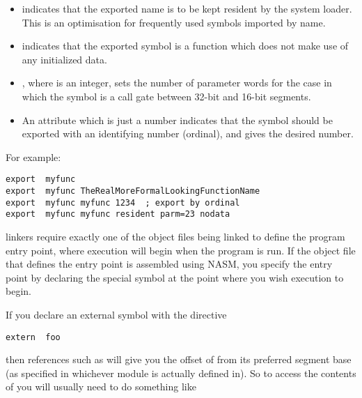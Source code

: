 \begin{itemize}
    \item{ indicates that the exported name is
        to be kept resident by the system loader. This is
        an optimisation for frequently used symbols imported
        by name.}

    \item{ indicates that the exported symbol
        is a function which does not make use of any initialized
        data.}

    \item{, where  is an integer, sets
        the number of parameter words for the case in which
        the symbol is a call gate between 32-bit and 16-bit
        segments.}

    \item{An attribute which is just a number indicates that
        the symbol should be exported with an identifying
        number (ordinal), and gives the desired number.}
\end{itemize}

For example:

\begin{lstlisting}
export  myfunc
export  myfunc TheRealMoreFormalLookingFunctionName
export  myfunc myfunc 1234  ; export by ordinal
export  myfunc myfunc resident parm=23 nodata
\end{lstlisting}


 linkers require exactly one of the object files being linked to
define the program entry point, where execution will begin when the
program is run. If the object file that defines the entry point is
assembled using NASM, you specify the entry point by declaring the
special symbol  at the point where you wish execution to
begin.


If you declare an external symbol with the directive

\begin{lstlisting}
extern  foo
\end{lstlisting}

then references such as  will give you the offset of
 from its preferred segment base (as specified in whichever
module  is actually defined in). So to access the contents of
 you will usually need to do something like

